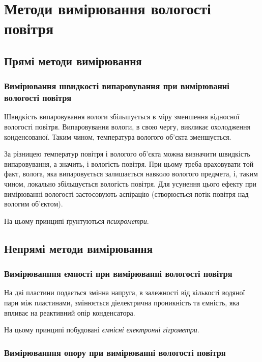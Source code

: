 \chapter{Методи вимірювання вологості повітря}

\section{Прямі методи вимірювання}

\subsection{Вимірювання швидкості випаровування при вимірюванні вологості повітря}

Швидкість випаровування вологи збільшується в міру зменшення відносної вологості повітря.
Випаровування вологи, в свою чергу, викликає охолодження конденсованої. Таким чином, температура
вологого об'єкта зменшується.

За різницею температур повітря і вологого об'єкта можна визначити
швидкість випаровування, а значить, і вологість повітря. При цьому треба враховувати той факт,
волога, яка випаровується залишається навколо вологого предмета, і, таким чином, локально
збільшується вологість повітря. Для усунення цього ефекту при вимірюванні вологості застосовують
аспірацію (створюється потік повітря над вологим об'єктом).

На цьому принципі ґрунтуються \textit{психрометри}.

\section{Непрямі методи вимірювання}

\subsection{Вимірюванння ємності  при вимірюванні вологості повітря}

На дві пластини подається змінна напруга, в залежності від кількості водяної пари між пластинами,
змінюється діелектрична проникність та ємність, яка впливає на реактивний опір конденсатора.

На цьому принципі побудовані \textit{ємнісні електронні гігрометри}.

\subsection{Вимірюванння опору при вимірюванні вологості повітря}

